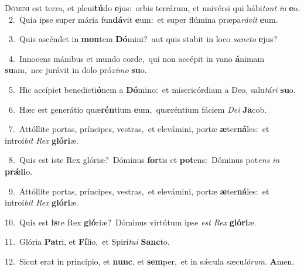 \lettrine{\initial\textcolor{\initialcolor}{D}}{ómini} est terra, et pleni\-\textbf{tú}\-do \textbf{e}\-jus:~\star orbis terrárum, et univérsi qui hábi\textit{tant} \textit{in} \textbf{e}\-o.\\
{\numbfont\textcolor{\numbcolor}{~2.}}~Quia ipse super mária fun\-\textbf{dá}\-vit \textbf{e}\-um:~\star et super flúmina præpa\-\textit{rá}\-\textit{vit} \textbf{e}\-um.\par
{\numbfont\textcolor{\numbcolor}{~3.}}~Quis ascéndet in \textbf{mon}\-tem \textbf{Dó}\-mini?~\star aut quis stabit in loco \textit{sanc}\-\textit{to} \textbf{e}\-jus?\par
{\numbfont\textcolor{\numbcolor}{~4.}}~Innocens mánibus et mundo corde,~\dagger qui non accépit in vano \textbf{á}\-nimam \textbf{su}\-am,~\star nec jurávit in dolo pró\-\textit{xi}\-\textit{mo} \textbf{su}\-o.\par
{\numbfont\textcolor{\numbcolor}{~5.}}~Hic accípiet benedicti\-\textbf{ó}\-nem a \textbf{Dó}\-mino:~\star et misericórdiam a Deo, salu\-\textit{tá}\-\textit{ri} \textbf{su}\-o.\par
{\numbfont\textcolor{\numbcolor}{~6.}}~Hæc est generátio quæ\-\textbf{rén}\-tium \textbf{e}\-um,~\star quæréntium fáciem \textit{De}\-\textit{i} \textbf{Ja}\-cob.\par
{\numbfont\textcolor{\numbcolor}{~7.}}~Attóllite portas, príncipes, vestras,~\dagger et elevámini, portæ \textbf{æ}\-ter\-\textbf{ná}\-les:~\star et introí\textit{bit} \textit{Rex} \textbf{gló}\-\textbf{ri}æ.\par
{\numbfont\textcolor{\numbcolor}{~8.}}~Quis est iste Rex glóriæ?~\dagger Dóminus \textbf{for}\-tis et \textbf{pot}\-ens:~\star Dóminus pot\textit{ens} \textit{in} \textbf{prǽ}\-\textbf{li}o.\par
{\numbfont\textcolor{\numbcolor}{~9.}}~Attóllite portas, príncipes, vestras,~\dagger et elevámini, portæ \textbf{æ}\-ter\-\textbf{ná}\-les:~\star et introí\textit{bit} \textit{Rex} \textbf{gló}\-\textbf{ri}æ.\par
{\numbfont\textcolor{\numbcolor}{10.}}~Quis est \textbf{is}\-te Rex \textbf{gló}\-riæ?~\star Dóminus virtútum ipse \textit{est} \textit{Rex} \textbf{gló}\-\textbf{ri}æ.\par
{\numbfont\textcolor{\numbcolor}{11.}}~Glória \textbf{Pa}\-tri, et \textbf{Fí}\-lio,~\star et Spirí\-\textit{tu}\-\textit{i} \textbf{Sanc}\-to.\par
{\numbfont\textcolor{\numbcolor}{12.}}~Sicut erat in princípio, et \textbf{nunc}\-, et \textbf{sem}\-per,~\star et in sǽcula sæcu\-\textit{ló}\-\textit{rum}. \textbf{A}\-men.\par
